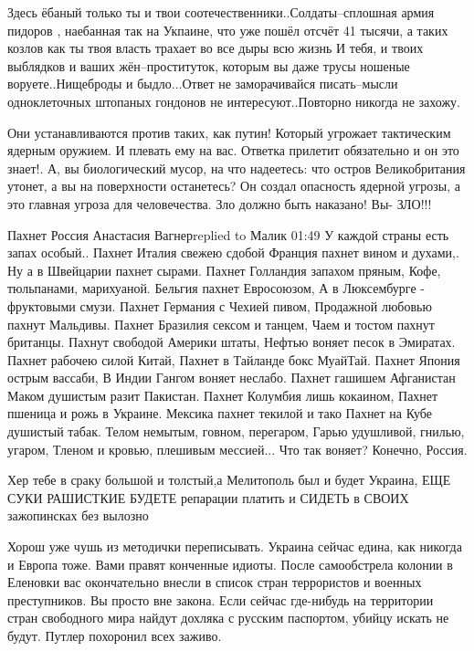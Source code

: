 Здесь ёбаный только ты и твои соотечественники..Солдаты--сплошная армия пидоров
, наебанная так на Укпаине, что уже пошёл отсчёт 41 тысячи, а таких козлов как
ты твоя власть трахает во все дыры всю жизнь И тебя, и твоих выблядков и ваших
жён--проституток, которым вы даже трусы ношеные воруете..Нищеброды и
быдло...Ответ не заморачивайся писать--мысли одноклеточных штопаных гондонов не
интересуют..Повторно никогда не захожу.

Они устанавливаются против таких, как путин! Который угрожает тактическим
ядерным оружием. И плевать ему на вас. Ответка прилетит обязательно и он это
знает!. А, вы биологический мусор, на что надеетесь: что остров Великобритания
утонет, а вы на поверхности останетесь? Он создал опасность ядерной угрозы, а
это главная угроза для человечества. Зло должно быть наказано! Вы- ЗЛО!!!

Пахнет Россия
Анастасия Вагнерreplied to Малик
01:49
У каждой страны есть запах особый..
Пахнет Италия свежею сдобой
Франция пахнет вином и духами,.
Ну а в Швейцарии пахнет сырами.
Пахнет Голландия запахом пряным,
Кофе, тюльпанами, марихуаной.
Бельгия пахнет Евросоюзом,
А в Люксембурге - фруктовыми смузи.
Пахнет Германия с Чехией пивом,
Продажной любовью пахнут Мальдивы.
Пахнет Бразилия сексом и танцем,
Чаем и тостом пахнут британцы.
Пахнут свободой Америки штаты,
Нефтью воняет песок в Эмиратах.
Пахнет рабочею силой Китай,
Пахнет в Тайланде бокс МуайТай.
Пахнет Япония острым вассаби,
В Индии Гангом воняет неслабо.
Пахнет гашишем Афганистан
Маком душистым разит Пакистан.
Пахнет Колумбия лишь кокаином,
Пахнет пшеница и рожь в Украине.
Мексика пахнет текилой и тако
Пахнет на Кубе душистый табак.
Телом немытым, говном, перегаром,
Гарью удушливой, гнилью, угаром,
Тленом и кровью, плешивым мессией...
Что так воняет? Конечно, Россия.

Хер тебе в сраку большой и толстый,а Мелитополь был и будет Украина, ЕЩЕ СУКИ
РАШИСТКИЕ БУДЕТЕ репарации платить и СИДЕТЬ в СВОИХ зажопинсках без вылозно

Хорош уже чушь из методички переписывать. Украина сейчас едина, как никогда и
Европа тоже. Вами правят конченные идиоты. После самообстрела колонии в
Еленовки вас окончательно внесли в список стран террористов и военных
преступников. Вы просто вне закона. Если сейчас где-нибудь на территории стран
свободного мира найдут дохляка с русским паспортом, убийцу искать не будут.
Путлер похоронил всех заживо.

